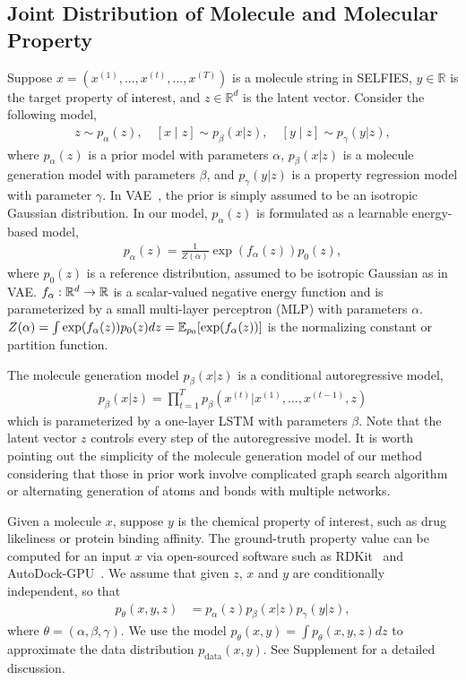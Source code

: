 \documentclass[accepted]{uai2023} %
\begin{document}
\subsection{Joint Distribution of Molecule and Molecular Property}
\label{sec:soo}
Suppose $x = (x^{(1)}, ..., x^{(t)},..., x^{(T)})$ is a molecule string in SELFIES, $y \in \mathbb{R}$ is the target property of interest, and $z \in \mathbb{R}^d$ is the latent vector. Consider the following model, 
\begin{align}
z \sim p_{\alpha}(z), \quad [x \mid z] \sim p_\beta(x|z), \quad [y \mid z] \sim p_\gamma(y|z),
\end{align}
where $p_{\alpha}(z)$ is a prior model with parameters $\alpha$, $p_\beta(x|z)$ is a molecule generation model with parameters $\beta$, and $p_\gamma(y|z)$ is a property regression model with parameter $\gamma$. In VAE~\citep{kingma2013auto}, the prior is simply assumed to be an isotropic Gaussian distribution. In our model, $p_{\alpha}(z)$ is formulated as a learnable energy-based model,
\begin{align}
p_{\alpha}(z) = \frac{1}{Z(\alpha)} \exp(f_{\alpha}(z)) p_0(z), \label{eq:prior}
\end{align}   
where $p_0(z)$ is a reference distribution, assumed to be isotropic Gaussian as in VAE. $f_{\alpha}: {\mathbb{R}}^{d} \rightarrow {\mathbb{R}}$ is a scalar-valued negative energy function and is parameterized by a small multi-layer perceptron (MLP) with parameters $\alpha$. $Z(\alpha) = \int \exp(f_\alpha (z)) p_0(z) dz = \mathbb{E}_{p_0}[\exp(f_\alpha(z))]$ is the normalizing constant or partition function. 

The molecule generation model $p_{\beta}(x|z)$ is a conditional autoregressive model,
\begin{align} 
    p_\beta(x|z) = \prod_{t=1}^T p_\beta(x^{(t)}|x^{(1)}, ..., x^{(t-1)}, z) 
\end{align} 
which is parameterized by a one-layer LSTM \cite{hochreiter1997long} with parameters $\beta$. Note that the latent vector $z$ controls every step of the autoregressive model. It is worth pointing out the simplicity of the molecule generation model of our method considering that those in prior work involve complicated graph search algorithm or alternating generation of atoms and bonds with multiple networks. 

Given a molecule $x$, suppose $y$ is the chemical property of interest, such as drug likeliness or protein  binding affinity. The ground-truth property value can be computed for an input $x$ via open-sourced software such as RDKit~\citep{landrum2013rdkit} and AutoDock-GPU~\citep{santos2021accelerating}. We assume that given $z$, $x$ and $y$ are conditionally independent, so that 
\begin{align}
p_{\theta}(x, y, z) &= p_{\alpha}(z) p_\beta(x|z) p_\gamma( y|z),
\label{eq:joint}
\end{align}
where $\theta = (\alpha, \beta, \gamma)$. We use the model $p_\theta(x, y) = \int p_\theta(x, y, z)dz $ to approximate the data distribution  $p_\mathrm{data}(x, y)$. See Supplement for a detailed discussion. 
\end{document}
